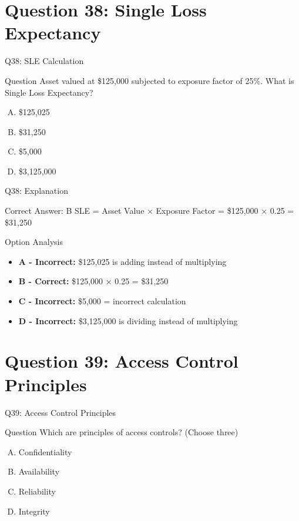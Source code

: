 \documentclass{beamer}
\begin{document}
	\section{Question 38: Single Loss Expectancy}
	
	\begin{frame}{Q38: SLE Calculation}
		\begin{block}{Question}
			Asset valued at \$125,000 subjected to exposure factor of 25\%. What is Single Loss Expectancy?
		\end{block}
		\begin{enumerate}[(A)]
			\item \$125,025
			\item \$31,250
			\item \$5,000
			\item \$3,125,000
		\end{enumerate}
	\end{frame}
	
	\begin{frame}{Q38: Explanation}
		\begin{block}{Correct Answer: B}
			SLE = Asset Value × Exposure Factor = \$125,000 × 0.25 = \$31,250
		\end{block}
		\begin{block}{Option Analysis}
			\begin{itemize}
				\item \textbf{A - Incorrect:} \$125,025 is adding instead of multiplying
				\item \textbf{B - Correct:} \$125,000 × 0.25 = \$31,250
				\item \textbf{C - Incorrect:} \$5,000 = incorrect calculation
				\item \textbf{D - Incorrect:} \$3,125,000 is dividing instead of multiplying
			\end{itemize}
		\end{block}
	\end{frame}
	
	\section{Question 39: Access Control Principles}
	
	\begin{frame}{Q39: Access Control Principles}
		\begin{block}{Question}
			Which are principles of access controls? (Choose three)
		\end{block}
		\begin{enumerate}[(A)]
			\item Confidentiality
			\item Availability
			\item Reliability
			\item Integrity
		\end{enumerate}
	\end{frame}
	
\end{document}
